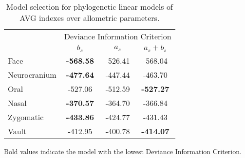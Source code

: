 \begin{table}[ht]
  \centering
  \begin{threeparttable}
    \caption{Model selection for phylogenetic linear models of AVG indexes over allometric parameters. \label{tab:dic_allo_im}}
    \begin{tabular}{lccc}
      \toprule
      & \multicolumn{3}{c}{\small{Deviance Information Criterion}} \\
      & $b_s$ & $a_s$ & $a_s + b_s$ \\ 
      \midrule
      Face & {\bf -568.58} & -526.41 & -568.04 \\ 
      Neurocranium & {\bf -477.64} & -447.44 & -463.70 \\ 
      Oral & -527.06 & -512.59 & {\bf -527.27} \\ 
      Nasal & {\bf -370.57} & -364.70 & -366.84 \\ 
      Zygomatic & {\bf -433.86} & -424.77 & -431.43 \\ 
      Vault & -412.95 & -400.78 & {\bf -414.07} \\ 
      \bottomrule
    \end{tabular}
    \begin{tablenotes}
      \footnotesize{
        \item Bold values indicate the model with the lowest Deviance Information Criterion.
        }
    \end{tablenotes}
  \end{threeparttable}
\end{table}